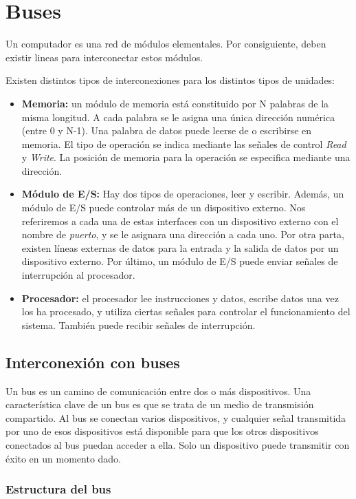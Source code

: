 \section{Buses}

Un computador es una red de módulos elementales. Por consiguiente, deben existir lineas para interconectar estos módulos.

Existen distintos tipos de interconexiones para los distintos tipos de unidades:

\begin{itemize}
  \item \textbf{Memoria:} un módulo de memoria está constituido por N palabras de la misma longitud. A cada palabra se le asigna una única dirección numérica (entre 0 y N-1). Una palabra de datos puede leerse de o escribirse en memoria. El tipo de operación se indica mediante las señales de control \textit{Read} y \textit{Write}. La posición de memoria para la operación se especifica mediante una dirección.
  \item \textbf{Módulo de E/S:} Hay dos tipos de operaciones, leer y escribir. Además, un módulo de E/S puede controlar más de un dispositivo externo. Nos referiremos a cada una de estas interfaces con un dispositivo externo con el nombre de \textit{puerto}, y se le asignara una dirección a cada uno. Por otra parta, existen líneas externas de datos para la entrada y la salida de datos por un dispositivo externo. Por último, un módulo de E/S puede enviar señales de interrupción al procesador.
  \item\textbf{Procesador:} el procesador lee instrucciones y datos, escribe datos una vez los ha procesado, y utiliza ciertas señales para controlar el funcionamiento del sistema. También puede recibir señales de interrupción.
\end{itemize}

\subsection{Interconexión con buses}

Un bus es un camino de comunicación entre dos o más dispositivos. Una característica clave de un bus es que se trata de un medio de transmisión compartido. Al bus se conectan varios dispositivos, y cualquier señal transmitida por uno de esos dispositivos está disponible para que los otros dispositivos conectados al bus puedan acceder a ella. Solo un dispositivo puede transmitir con éxito en un momento dado.

\subsubsection{Estructura del bus}

